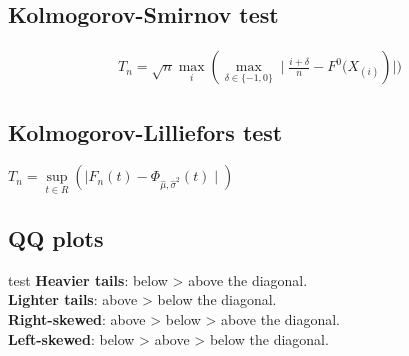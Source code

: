 \subsection{Kolmogorov-Smirnov test}
\begin{align*}
T_n = \sqrt{n}\underset{i}{\max}(\underset{\delta \in \{-1,0\}}{\max}\mid{ \frac{i+\delta}{n} - F^{0}(X_{(i)}})\mid)
\end{align*}
\subsection{Kolmogorov-Lilliefors test}
$T_n = \underset{t \in R}{\sup}(\mid{F_{n}(t) -  \Phi_{\hat{\mu},\hat{\sigma}^2}(t)}\mid)$
\subsection{QQ plots} test
\textbf{Heavier tails}: below > above the diagonal.\\
\textbf{Lighter tails}: above > below the diagonal.\\
\textbf{Right-skewed}: above > below > above the diagonal.\\
\textbf{Left-skewed}: below > above > below the diagonal.\\
